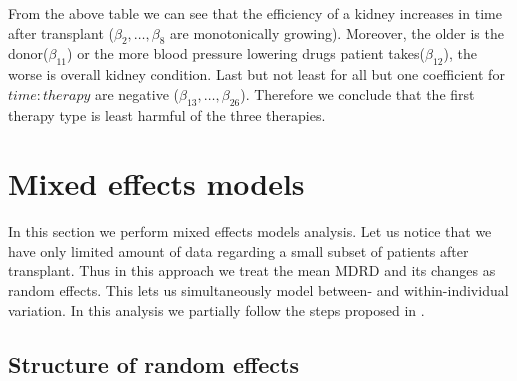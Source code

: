\documentclass[num-refs]{wiley-article}
\begin{document}
From the above table we can see that the efficiency of a kidney increases in time after transplant ($\beta_2, \ldots, \beta_8$ are monotonically growing). Moreover, the older is the donor($\beta_{11}$) or the more blood pressure lowering drugs patient takes($\beta_{12}$), the worse is overall kidney condition. Last but not least for all but one coefficient for $time:therapy$ are negative ($\beta_{13}, \ldots, \beta_{26}$). Therefore we conclude that the first therapy type is least harmful of the three therapies.



\section{Mixed effects models}
In this section we perform mixed effects models analysis. Let us notice that we have only limited amount of data regarding a small subset of patients after transplant. Thus in this approach we treat the mean MDRD and its changes as random effects. This lets us simultaneously model between- and within-individual variation.
In this analysis we  partially follow the steps proposed in \cite{PBI}.\\

\subsection{Structure of random effects}
\end{document}
